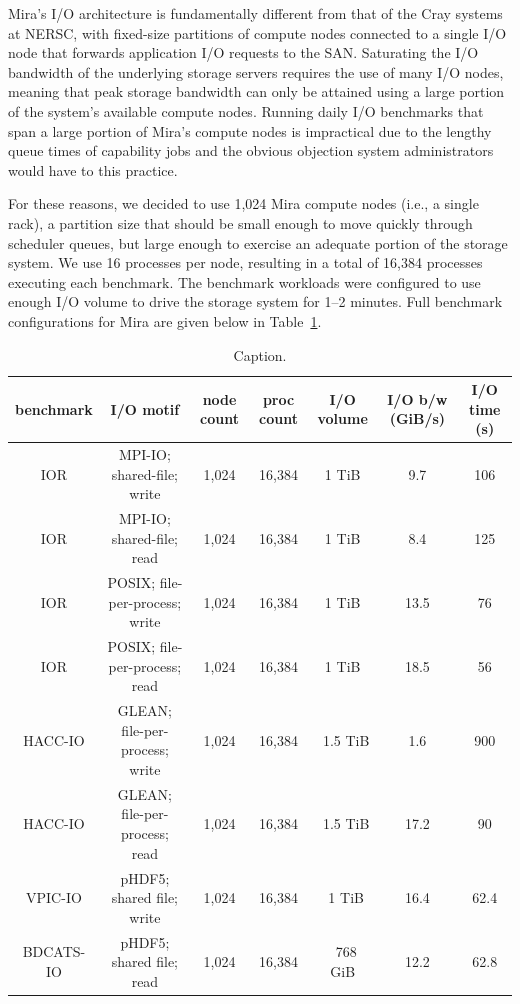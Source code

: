 \documentclass[conference,10pt,compsocconf]{IEEEtran}
\begin{document}
Mira's I/O architecture is fundamentally different from that of the Cray
systems at NERSC, with fixed-size partitions of compute nodes connected to
a single I/O node that forwards application I/O requests to the SAN.
Saturating the I/O bandwidth of the underlying storage servers requires the
use of many I/O nodes, meaning that peak storage bandwidth can only be
attained using a large portion of the system's available compute nodes.
Running daily I/O benchmarks that span a large portion of Mira's compute
nodes is impractical due to the lengthy queue times of capability jobs and
the obvious objection system administrators would have to this practice.

For these reasons, we decided to use 1,024 Mira compute nodes (i.e., a single
rack), a partition size that should be small enough to move quickly through
scheduler queues, but large enough to exercise an adequate portion of the
storage system. We use 16 processes per node, resulting in a total of 16,384
processes executing each benchmark. The benchmark workloads were configured
to use enough I/O volume to drive the storage system for 1--2 minutes.
Full benchmark configurations for Mira are given below in
Table~\ref{tab:mira-bench-config}.

\begin{table}[h]
\centering
\begin{tabular}{|c|c|c|c|c|c|c|}
\hline
benchmark & I/O motif & node count & proc count & I/O volume & I/O b/w (GiB/s) & I/O time (s) \\
\hline
IOR & MPI-IO; shared-file; write & 1,024 & 16,384 & 1 TiB & 9.7 & 106 \\
\hline
IOR & MPI-IO; shared-file; read & 1,024 & 16,384 & 1 TiB & 8.4 & 125 \\
\hline
IOR & POSIX; file-per-process; write & 1,024 & 16,384 & 1 TiB & 13.5 & 76 \\
\hline
IOR & POSIX; file-per-process; read & 1,024 & 16,384 & 1 TiB & 18.5 & 56 \\
\hline
HACC-IO & GLEAN; file-per-process; write & 1,024 & 16,384 & ~1.5 TiB & 1.6 & 900 \\
\hline
HACC-IO & GLEAN; file-per-process; read & 1,024 & 16,384 & ~1.5 TiB & 17.2 & 90 \\
\hline
VPIC-IO & pHDF5; shared file; write & 1,024 & 16,384 & ~1 TiB & 16.4 & 62.4 \\
\hline
BDCATS-IO & pHDF5; shared file; read & 1,024 & 16,384 & ~768 GiB & 12.2 & 62.8 \\
\hline
\end{tabular}
\caption{Caption.}
\label{tab:mira-bench-config}
\end{table}
\end{document}
